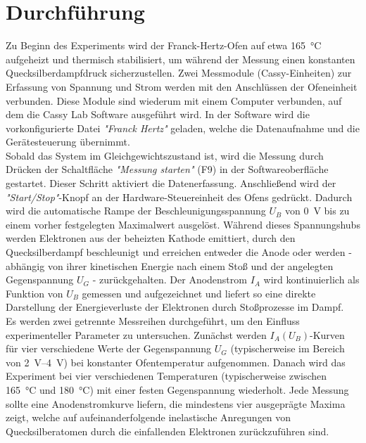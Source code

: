\section{Durchführung}

Zu Beginn des Experiments wird der Franck-Hertz-Ofen auf etwa \SI{165}{\celsius} aufgeheizt und thermisch stabilisiert, um während der Messung einen konstanten Quecksilberdampfdruck sicherzustellen. Zwei Messmodule (Cassy-Einheiten) zur Erfassung von Spannung und Strom werden mit den Anschlüssen der Ofeneinheit verbunden. Diese Module sind wiederum mit einem Computer verbunden, auf dem die Cassy Lab Software ausgeführt wird. In der Software wird die vorkonfigurierte Datei \textit{"Franck Hertz"} geladen, welche die Datenaufnahme und die Gerätesteuerung übernimmt.
\vspace{0.3cm}\\
Sobald das System im Gleichgewichtszustand ist, wird die Messung durch Drücken der Schaltfläche \textit{"Messung starten"} (F9) in der Softwareoberfläche gestartet. Dieser Schritt aktiviert die Datenerfassung. Anschließend wird der \textit{"Start/Stop"}-Knopf an der Hardware-Steuereinheit des Ofens gedrückt. Dadurch wird die automatische Rampe der Beschleunigungsspannung $U_B$ von \SI{0}{\volt} bis zu einem vorher festgelegten Maximalwert ausgelöst. Während dieses Spannungshubs werden Elektronen aus der beheizten Kathode emittiert, durch den Quecksilberdampf beschleunigt und erreichen entweder die Anode oder werden - abhängig von ihrer kinetischen Energie nach einem Stoß und der angelegten Gegenspannung $U_G$ - zurückgehalten. Der Anodenstrom $I_A$ wird kontinuierlich als Funktion von $U_B$ gemessen und aufgezeichnet und liefert so eine direkte Darstellung der Energieverluste der Elektronen durch Stoßprozesse im Dampf.
\vspace{0.3cm}\\
Es werden zwei getrennte Messreihen durchgeführt, um den Einfluss experimenteller Parameter zu untersuchen. Zunächst werden $I_A(U_B)$-Kurven für vier verschiedene Werte der Gegenspannung $U_G$ (typischerweise im Bereich von \SIrange{2}{4}{\volt}) bei konstanter Ofentemperatur aufgenommen. Danach wird das Experiment bei vier verschiedenen Temperaturen (typischerweise zwischen \SI{165}{\celsius} und \SI{180}{\celsius}) mit einer festen Gegenspannung wiederholt. Jede Messung sollte eine Anodenstromkurve liefern, die mindestens vier ausgeprägte Maxima zeigt, welche auf aufeinanderfolgende inelastische Anregungen von Quecksilberatomen durch die einfallenden Elektronen zurückzuführen sind.
